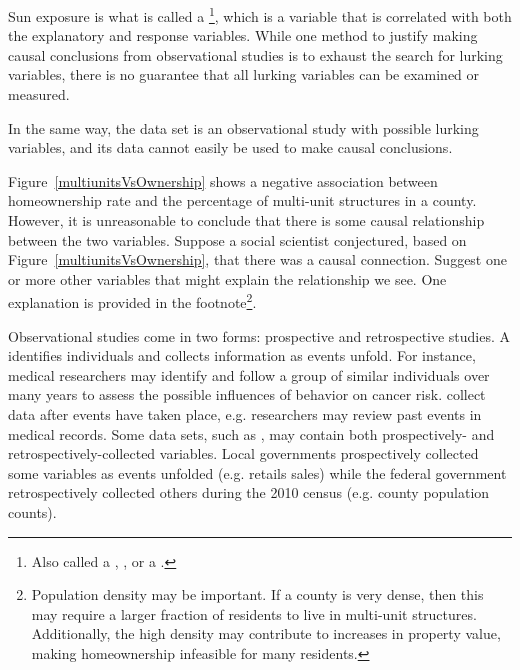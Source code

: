 Sun exposure is what is called a \footnote{Also called a , , or a .}, which is a variable that is correlated with both the explanatory and response variables. While one method to justify making causal conclusions from observational studies is to exhaust the search for lurking variables, there is no guarantee that all lurking variables can be examined or measured.

In the same way, the  data set is an observational study with possible lurking variables, and its data cannot easily be used to make causal conclusions.

\begin{exercise}
Figure~\ref{multiunitsVsOwnership} shows a negative association between homeownership rate and the percentage of multi-unit structures in a county. However, it is unreasonable to conclude that there is some causal relationship between the two variables. Suppose a social scientist conjectured, based on Figure~\ref{multiunitsVsOwnership}, that there was a causal connection. Suggest one or more other variables that might explain the relationship we see. One explanation is provided in the footnote\footnote{Population density may be important. If a county is very dense, then this may require a larger fraction of residents to live in multi-unit structures. Additionally, the high density may contribute to increases in property value, making homeownership infeasible for many residents.}.
\end{exercise}

Observational studies come in two forms: prospective and retrospective studies. A  identifies individuals and collects information as events unfold. For instance, medical researchers may identify and follow a group of similar individuals over many years to assess the possible influences of behavior on cancer risk.  collect data after events have taken place, e.g. researchers may review past events in medical records. Some data sets, such as , may contain both prospectively- and retrospectively-collected variables. Local governments prospectively collected some variables as events unfolded (e.g. retails sales) while the federal government retrospectively collected others during the 2010 census (e.g. county population counts). %

